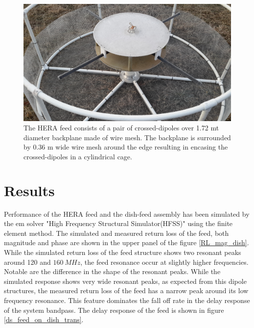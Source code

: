 \documentclass[twocolumn]{emulateapj}
\newcommand{\vis}{{V}}
\begin{document}
\begin{figure}
\centering
\includegraphics[trim={2cm 10cm 20cm 5cm},clip, totalheight=0.3\textheight]{plots/herafeed.jpg}
\vspace{1.0 em}
\caption{The HERA feed consists of a pair of crossed-dipoles over 1.72 mt diameter backplane made of wire mesh. The backplane is surrounded by 0.36 m wide wire mesh around the edge resulting in encasing the crossed-dipoles in a cylindrical cage.}
\label{fig:herafeed}
\end{figure}


\section{\textbf{Results}}

Performance of the HERA feed and the dish-feed assembly has been simulated by
the em solver "High Frequency Structural Simulator(HFSS)" using the finite
element method.  The simulated and measured return loss of the feed, both
magnitude and phase are shown in the upper panel of the figure
\ref{RL_mag_dish}. While the simulated return loss of the feed structure shows
two resonant peaks around 120 and $160~MHz$, the feed resonance occur at
slightly higher frequencies. Notable are the difference in the shape of the
resonant peaks. While the simulated response shows very wide resonant peaks, as
expected from this dipole structures, the measured return loss of the feed has
a narrow peak around its low frequency resonance. This feature dominates the
fall off rate in the delay response of the system bandpass. The delay response
of the feed is shown in figure \ref{ds_feed_on_dish_trans}. 
\end{document}
